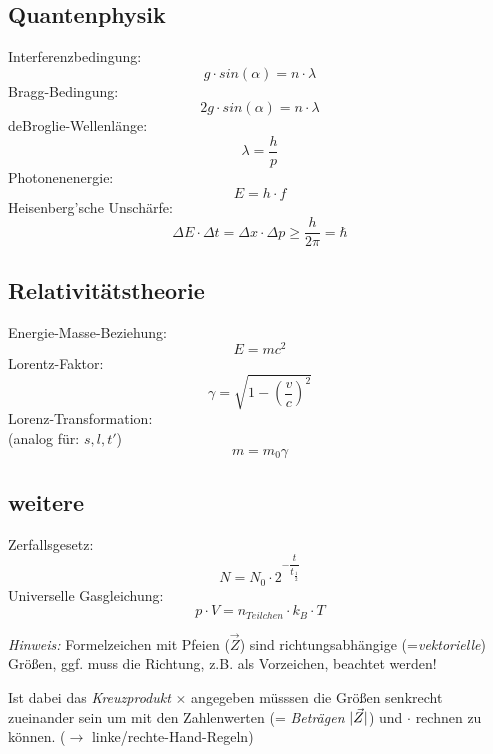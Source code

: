 \documentclass[12pt,a4paper,oneside]{article}
\begin{document}
\begin{multicols}{3}
\subsection*{Quantenphysik}
Interferenzbedingung:
$$ g \cdot sin(\alpha) = n \cdot \lambda $$
Bragg-Bedingung:
$$ 2 g \cdot sin(\alpha) = n \cdot \lambda $$
deBroglie-Wellenlänge:
$$ \lambda = \frac{h}{p} $$
Photonenenergie:
$$ E = h \cdot f $$
Heisenberg'sche Unschärfe:
$$ \Delta E \cdot \Delta t = \Delta x \cdot \Delta p \geq \frac{h}{2\pi} = \hbar $$

\subsection*{Relativitätstheorie}
Energie-Masse-Beziehung:
$$ E = mc^2 $$
Lorentz-Faktor:
$$ \gamma = \sqrt{1-(\frac{v}{c})^2} $$
Lorenz-Transformation:\\
(analog für: $s, l, t'$)
$$ m = m_0 \gamma $$

\subsection*{weitere}
Zerfallsgesetz:
$$ N = N_0 \cdot 2^{-\dfrac{t}{t_{\frac{1}{2}}}} $$
Universelle Gasgleichung:
$$ p \cdot V = n_{Teilchen} \cdot k_B \cdot T $$


\end{multicols}
\emph{Hinweis:} Formelzeichen mit Pfeien ($\vec{Z}$) sind richtungsabhängige (=\textit{vektorielle}) Größen, ggf. muss die Richtung, z.B. als Vorzeichen, beachtet werden!

Ist dabei das \textit{Kreuzprodukt} $\times$ angegeben müsssen die Größen senkrecht zueinander sein um mit den Zahlenwerten (= \textit{Beträgen} $\lvert\vec{Z}\rvert$) und $\cdot$ rechnen zu können. ($\rightarrow$ linke/rechte-Hand-Regeln)

\end{document}
